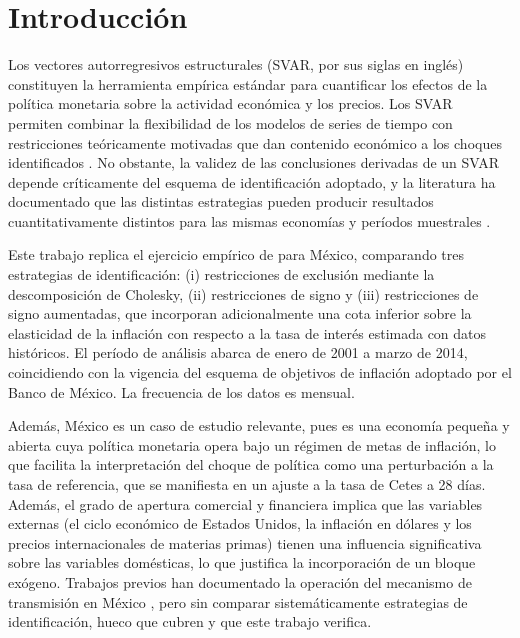 \documentclass[12pt,a4paper]{article}
\begin{document}
\section{Introducción}

Los vectores autorregresivos estructurales (SVAR, por sus siglas en inglés) constituyen
la herramienta empírica estándar para cuantificar los efectos de la política monetaria
sobre la actividad económica y los precios.
Los SVAR permiten combinar la flexibilidad de los modelos de series
de tiempo con restricciones teóricamente motivadas que dan contenido económico a los
choques identificados \citep{sims1980}.
No obstante, la validez de las conclusiones derivadas de un SVAR depende críticamente
del esquema de identificación adoptado, y la literatura ha documentado que las
distintas estrategias pueden producir resultados cuantitativamente distintos para las mismas economías y períodos muestrales
\citep{faust1998, uhlig2005}.

Este trabajo replica el ejercicio empírico de \citet{carrilloelizondo2018} para México,
comparando tres estrategias de identificación: (i) restricciones de exclusión mediante
la descomposición de Cholesky, (ii) restricciones de signo y (iii) restricciones de signo aumentadas, que incorporan
adicionalmente una cota inferior sobre la elasticidad de la inflación con respecto a la
tasa de interés estimada con datos históricos.
El período de análisis abarca de enero de 2001 a marzo de 2014, coincidiendo con la
vigencia del esquema de objetivos de inflación adoptado por el Banco de México. La frecuencia de los datos es mensual.

Además, México es un caso de estudio relevante, pues es una economía pequeña y abierta cuya política monetaria opera bajo un régimen de metas de inflación, lo que
facilita la interpretación del choque de política como una perturbación a la tasa de referencia, que se manifiesta en un ajuste a la tasa de Cetes a 28 días. Además, el grado de apertura comercial y financiera implica que las
variables externas (el ciclo económico de Estados Unidos, la inflación en dólares y los
precios internacionales de materias primas) tienen una influencia significativa sobre
las variables domésticas, lo que justifica la incorporación de un bloque exógeno.
Trabajos previos han documentado la operación del mecanismo de transmisión en México
\citep{ramosfranciatorres2005, elizondo2012}, pero sin comparar sistemáticamente
estrategias de identificación, hueco que \citet{carrilloelizondo2018} cubren y que este
trabajo verifica.
\end{document}
